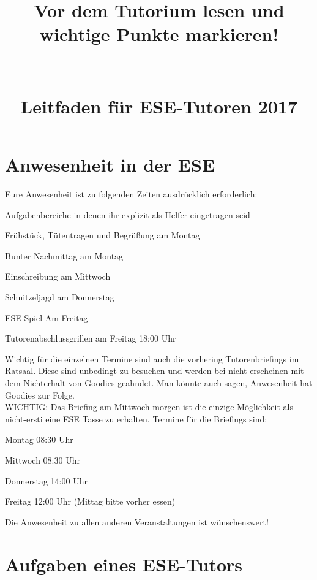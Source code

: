 \documentclass[a4paper,12pt]{report}
\begin{document}
\title{\huge{\textbf{Vor dem Tutorium lesen und wichtige Punkte markieren!}}\\\ \\\ \\{Leitfaden für ESE-Tutoren 2017}}
\date{}
\author{}
\maketitle

\section*{Anwesenheit in der ESE}
Eure Anwesenheit ist zu folgenden Zeiten ausdrücklich erforderlich:
\begin{itemize*}
	\item Aufgabenbereiche in denen ihr explizit als Helfer eingetragen seid
	\item Frühstück, Tütentragen und Begrüßung am Montag
	\item Bunter Nachmittag am Montag
	\item Einschreibung am Mittwoch
	\item Schnitzeljagd am Donnerstag
	\item ESE-Spiel Am Freitag
	\item Tutorenabschlussgrillen am Freitag 18:00 Uhr
\end{itemize*}
Wichtig für die einzelnen Termine sind auch die vorhering Tutorenbriefings im Ratsaal. Diese sind unbedingt zu besuchen und werden bei nicht erscheinen mit dem Nichterhalt von Goodies geahndet. Man könnte auch sagen, Anwesenheit hat Goodies zur Folge.\\
WICHTIG: Das Briefing am Mittwoch morgen ist die einzige Möglichkeit als nicht-ersti eine ESE Tasse zu erhalten.
Termine für die Briefings sind:
\begin{itemize*}
	\item Montag   		08:30 Uhr
	\item Mittwoch 		08:30 Uhr
	\item Donnerstag	14:00 Uhr
	\item Freitag		12:00 Uhr (Mittag bitte vorher essen)
\end{itemize*}

Die Anwesenheit zu allen anderen Veranstaltungen ist wünschenswert!

\section*{Aufgaben eines ESE-Tutors}
\end{document}

